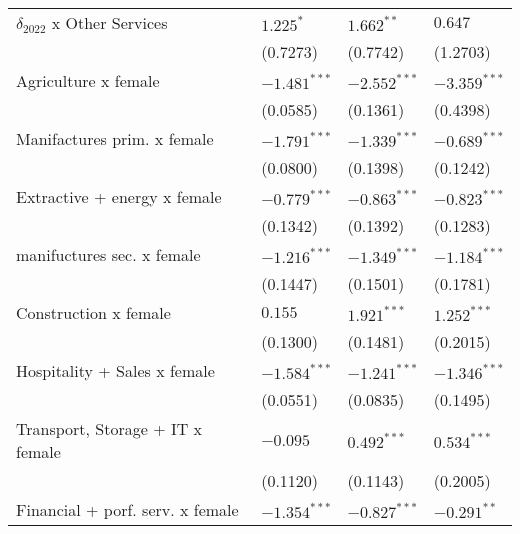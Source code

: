 \begin{tabular}{llll}
$\delta_{2022}$ x Other Services                   &          $1.225^*$ &       $1.662^{**}$ &            $0.647$ \\
                                                   &           (0.7273) &           (0.7742) &           (1.2703) \\
Agriculture x female                               &     $-1.481^{***}$ &     $-2.552^{***}$ &     $-3.359^{***}$ \\
                                                   &           (0.0585) &           (0.1361) &           (0.4398) \\
Manifactures prim. x female                        &     $-1.791^{***}$ &     $-1.339^{***}$ &     $-0.689^{***}$ \\
                                                   &           (0.0800) &           (0.1398) &           (0.1242) \\
Extractive + energy x female                       &     $-0.779^{***}$ &     $-0.863^{***}$ &     $-0.823^{***}$ \\
                                                   &           (0.1342) &           (0.1392) &           (0.1283) \\
manifuctures sec. x female                         &     $-1.216^{***}$ &     $-1.349^{***}$ &     $-1.184^{***}$ \\
                                                   &           (0.1447) &           (0.1501) &           (0.1781) \\
Construction x female                              &            $0.155$ &      $1.921^{***}$ &      $1.252^{***}$ \\
                                                   &           (0.1300) &           (0.1481) &           (0.2015) \\
Hospitality + Sales x female                       &     $-1.584^{***}$ &     $-1.241^{***}$ &     $-1.346^{***}$ \\
                                                   &           (0.0551) &           (0.0835) &           (0.1495) \\
Transport, Storage + IT x female                   &           $-0.095$ &      $0.492^{***}$ &      $0.534^{***}$ \\
                                                   &           (0.1120) &           (0.1143) &           (0.2005) \\
Financial + porf. serv. x female                   &     $-1.354^{***}$ &     $-0.827^{***}$ &      $-0.291^{**}$ \\

\end{tabular}
